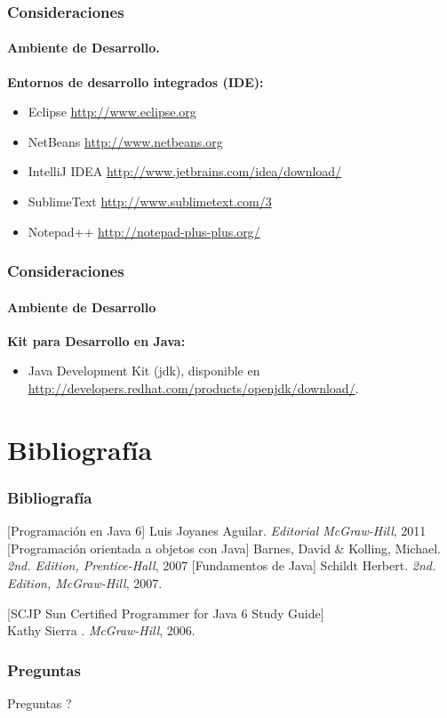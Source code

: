 \documentclass{beamer}
\begin{document}
		\begin{frame}
			\frametitle{Consideraciones}
			\framesubtitle{Ambiente de Desarrollo.}

			\textbf{Entornos de desarrollo integrados (IDE):}

			\begin{itemize}
				\item Eclipse  \url{http://www.eclipse.org}
				\item NetBeans \url{http://www.netbeans.org}
				\item IntelliJ IDEA  \url{http://www.jetbrains.com/idea/download/}
				\item SublimeText   \url{http://www.sublimetext.com/3}
				\item Notepad++  \url{http://notepad-plus-plus.org/}
			\end{itemize}

		\end{frame}

		\begin{frame}
			\frametitle{Consideraciones}
			\framesubtitle{Ambiente de Desarrollo}

			\textbf{Kit para Desarrollo en Java:}

			\begin{itemize}
				\item Java Development Kit (jdk), disponible en \url{http://developers.redhat.com/products/openjdk/download/}.
			\end{itemize}
		\end{frame}

	\section{Bibliograf\'ia}

		\begin{frame}
			\frametitle{Bibliograf\'ia}

			\begin{thebibliography}{10}
				\beamertemplatebookbibitems
				[Programaci\'on en Java 6] Luis Joyanes Aguilar. \newblock \emph{Editorial McGraw-Hill}, 2011
				[Programaci\'on orientada a objetos con Java] Barnes, David \& Kolling, Michael. \newblock \emph{2nd. Edition, Prentice-Hall}, 2007
				[Fundamentos de Java] Schildt Herbert. \newblock \emph{2nd. Edition, McGraw-Hill}, 2007.

[SCJP Sun Certified Programmer for Java 6 Study Guide]\\ Kathy Sierra . \newblock \emph{ McGraw-Hill}, 2006.
			\end{thebibliography}
		\end{frame}

		\begin{frame}
			\frametitle{Preguntas}

			\hspace{4cm}\huge{Preguntas ?}

		\end{frame}
	
\end{document}
